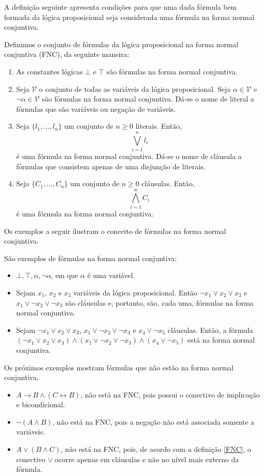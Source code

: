 A definição seguinte apresenta condições para que uma dada fórmula bem
formada da lógica proposicional seja considerada uma fórmula na forma
normal conjuntiva.

\begin{Definition}\label{FNC}
Definimos o conjunto de fórmulas da lógica proposicional na forma
normal conjuntiva (FNC), da seguinte maneira:
\begin{enumerate}
  \item As constantes lógicas $\bot$ e $\top$ são fórmulas na forma
    normal conjuntiva.
  \item Seja $\mathcal{V}$ o conjunto de todas as variáveis da lógica
    proposicional. Seja $\alpha \in \mathcal{V}$ e
    $\neg\alpha\in\mathcal{V}$ são fórmulas na forma normal
    conjuntiva. Dá-se o nome de literal a fórmulas que são variáveis
    ou negação de variáveis.
  \item Seja $\{l_1,...,l_n\}$ um conjunto de $n\geq 0$
    literais. Então, \[\bigvee_{i=1}^nl_i\] é uma fórmula na forma
    normal conjuntiva. Dá-se o nome de cláusula a fórmulas que
    consistem apenas de uma disjunção de literais.
  \item Seja $\{C_1,...,C_n\}$ um conjunto de $n\geq 0$
    cláusulas. Então, \[\bigwedge_{i=1}^nC_i\] é uma fórmula na forma
    normal conjuntiva.
\end{enumerate}
\end{Definition}
Os exemplos a seguir ilustram o conceito de fórmulas na forma normal conjuntiva.
\begin{Example}
São exemplos de fórmulas na forma normal conjuntiva:
\begin{itemize}
     \item $\bot,\top,\alpha,\neg\alpha$, em que $\alpha$ é uma
       variável.
     \item Sejam $x_1$, $x_2$ e $x_3$ variáveis da lógica
       proposicional. Então $\neg x_1 \lor x_2 \lor x_3$ e $x_1\lor
       \neg x_2 \lor \neg x_3$ são cláusulas e, portanto, são, cada
       uma, fórmulas na forma normal conjuntiva.
     \item Sejam $\neg x_1 \lor x_2 \lor x_3$, $x_1\lor
       \neg x_2 \lor \neg x_3$ e $x_4 \lor \neg x_5$ cláusulas. Então, a fórmula
       $(\neg x_1 \lor x_2 \lor x_3)\land (x_1\lor
       \neg x_2 \lor \neg x_3) \land (x_4 \lor \neg x_5)$ está na forma normal conjuntiva.
\end{itemize}
Os próximos exemplos mostram fórmulas que não estão na forma normal
conjuntiva.
\begin{itemize}
    \item $A \to B \land (C \leftrightarrow B)$, não está na FNC, pois possui o conectivo de
      implicação e bicondicional.
    \item $\neg (A \land B)$, não está na FNC, pois a negação não está
      associada somente a variáveis.
    \item $A\lor(B \land C)$, não está na FNC, pois, de acordo com a
      definição \ref{FNC}, o conectivo $\lor$ ocorre apenas em
      cláusulas e não no nível mais externo da fórmula.
\end{itemize}
\end{Example}
